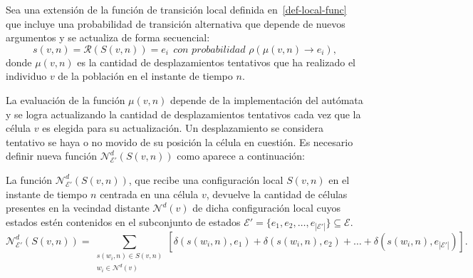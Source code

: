 \begin{definition}
\label{prop-newlocal-func-4}
Sea una extensi\'on de la funci\'on de transici\'on local definida en~\ref{def-local-func} que incluye una probabilidad de transici\'on alternativa que depende de nuevos argumentos y se actualiza de forma secuencial:
\begin{equation}
s(v,n) = \mathcal{R}(S(v,n)) = e_i~~\textit{con probabilidad } \rho(\mu(v,n) \rightarrow e_i), \label{eq-newlocal-func-4}
\end{equation}
donde $\mu(v,n)$ es la cantidad de desplazamientos tentativos que ha realizado el individuo $v$ de la poblaci\'on en el instante de tiempo $n$. 
\end{definition}

La evaluaci\'on de la funci\'on $\mu(v,n)$ depende de la implementaci\'on del aut\'omata y se logra actualizando la cantidad de desplazamientos tentativos cada vez que la c\'elula $v$ es elegida para su actualizaci\'on. Un desplazamiento se considera tentativo se haya o no movido de su posici\'on la c\'elula en cuesti\'on. Es necesario definir nueva funci\'on $\mathcal{N}_{\mathcal{E'}}^d(S(v,n))$ como aparece a continuaci\'on:

\begin{definition}
\label{def-normal-distant-neighbours}
La funci\'on $\mathcal{N}_{\mathcal{E'}}^d(S(v,n))$, que recibe una configuraci\'on local $S(v,n)$ en el instante de tiempo $n$ centrada en una c\'elula $v$, devuelve la cantidad de c\'elulas presentes en la vecindad distante $\mathcal{N}^{d}(v)$ de dicha configuraci\'on local cuyos estados est\'en contenidos en el subconjunto de estados $\mathcal{E'} = \lbrace e_1, e_2, \ldots , e_{|\mathcal{E'}|}\rbrace \subseteq \mathcal{E}$.
\begin{equation}
\mathcal{N}_{\mathcal{E'}}^d(S(v,n)) = \sum_{\substack{{s(w_i,n) \in S(v,n)}\\{w_i \in \mathcal{N}^{d}(v)}}} \left[\delta(s(w_i,n),e_1) + \delta(s(w_i,n),e_2) + \ldots + \delta(s(w_i,n),e_{|\mathcal{E'}|}) \right]. \label{eq-normal-distant-neighbours}
\end{equation}
\end{definition}

